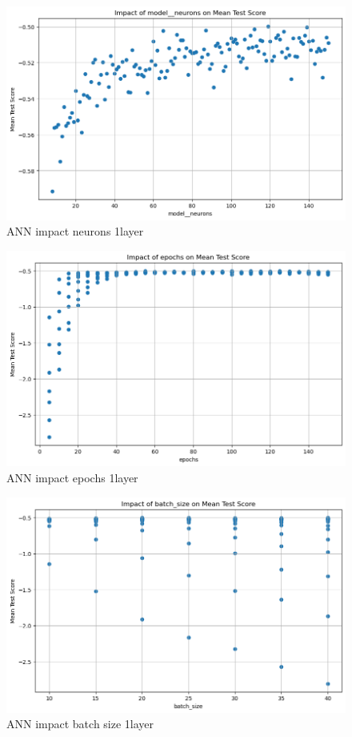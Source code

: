 \documentclass{article}
\begin{document}
\begin{figure}
	\centering
	\includegraphics[width=\linewidth]{figures/ANN_impact_neurons_1layer.png}
	\caption{ANN impact neurons 1layer}
	\label{fig:ANN-impact-neurons-1layer}
\end{figure}

\begin{figure}
	\centering
	\includegraphics[width=\linewidth]{figures/ANN_impact_epochs_1layer.png}
	\caption{ANN impact epochs 1layer}
	\label{fig:ANN-impact-epochs-1layer}
\end{figure}

\begin{figure}
	\centering
	\includegraphics[width=\linewidth]{figures/ANN_impact_batchsize_1layer.png}
	\caption{ANN impact batch size 1layer}
	\label{fig:ANN-impact-batchsize-1layer}
\end{figure}
\end{document}
